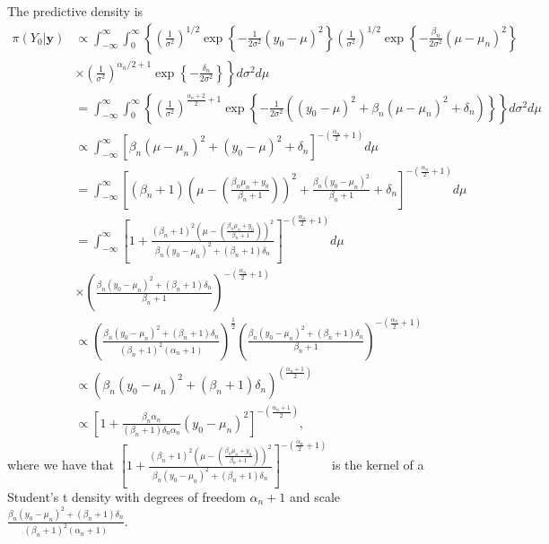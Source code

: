 \begin{enumerate}
The predictive density is
{\footnotesize{
\begin{align}
	\pi(Y_0|\mathbf{y})&\propto\int_{-\infty}^{\infty}\int_0^{\infty}\left\{ \left(\frac{1}{\sigma^2}\right)^{1/2}\exp\left\{-\frac{1}{2\sigma^2}(y_0-\mu)^2\right\}\left(\frac{1}{\sigma^2}\right)^{1/2}\exp\left\{-\frac{\beta_n}{2\sigma^2}(\mu-\mu_n)^2\right\}\right.\nonumber\\
	&\times \left.\left(\frac{1}{\sigma^2}\right)^{\alpha_n/2+1}\exp\left\{-\frac{\delta_n}{2\sigma^2}\right\}\right\}d\sigma^2d\mu\nonumber\\
	&=\int_{-\infty}^{\infty}\int_0^{\infty}\left\{ \left(\frac{1}{\sigma^2}\right)^{\frac{\alpha_n+2}{2}+1}\exp\left\{-\frac{1}{2\sigma^2}((y_0-\mu)^2+\beta_n(\mu-\mu_n)^2+\delta_n)\right\}\right\}d\sigma^2d\mu\nonumber\\
	&\propto\int_{-\infty}^{\infty}\left[\beta_n(\mu-\mu_n)^2+(y_0-\mu)^2+\delta_n\right]^{-\left(\frac{\alpha_n}{2}+1\right)}d\mu\nonumber\\
	&=\int_{-\infty}^{\infty}\left[(\beta_n+1)\left(\mu-\left(\frac{\beta_n\mu_n+y_0}{\beta_n+1}\right)\right)^2+\frac{\beta_n(y_0-\mu_n)^2}{\beta_n+1}+\delta_n\right]^{-\left(\frac{\alpha_n}{2}+1\right)}d\mu\nonumber\\
	&=\int_{-\infty}^{\infty}\left[1+\frac{(\beta_n+1)^2\left(\mu-\left(\frac{\beta_n\mu_n+y_0}{\beta_n+1}\right)\right)^2}{\beta_n(y_0-\mu_n)^2+(\beta_n+1)\delta_n}\right]^{-\left(\frac{\alpha_n}{2}+1\right)}d\mu\nonumber\\
	&\times\left(\frac{\beta_n(y_0-\mu_n)^2+(\beta_n+1)\delta_n}{\beta_n+1}\right)^{-\left(\frac{\alpha_n}{2}+1\right)}\nonumber\\
	&\propto\left(\frac{\beta_n(y_0-\mu_n)^2+(\beta_n+1)\delta_n}{(\beta_n+1)^2(\alpha_n+1)}\right)^{\frac{1}{2}}\left(\frac{\beta_n(y_0-\mu_n)^2+(\beta_n+1)\delta_n}{\beta_n+1}\right)^{-\left(\frac{\alpha_n}{2}+1\right)}\nonumber\\
	&\propto (\beta_n(y_0-\mu_n)^2+(\beta_n+1)\delta_n)^{\left(\frac{\alpha_n+1}{2}\right)}\nonumber\\
	&\propto\left[1+\frac{\beta_n\alpha_n}{(\beta_n+1)\delta_n\alpha_n}(y_0-\mu_n)^2\right]^{-\left(\frac{\alpha_n+1}{2}\right)},\nonumber
\end{align}
}}
where we have that $\left[1+\frac{(\beta_n+1)^2\left(\mu-\left(\frac{\beta_n\mu_n+y_0}{\beta_n+1}\right)\right)^2}{\beta_n(y_0-\mu_n)^2+(\beta_n+1)\delta_n}\right]^{-\left(\frac{\alpha_n}{2}+1\right)}$ is the kernel of a Student's t density with degrees of freedom $\alpha_n+1$ and scale $\frac{\beta_n(y_0-\mu_n)^2+(\beta_n+1)\delta_n}{(\beta_n+1)^2(\alpha_n+1)}$. 


\end{enumerate}
